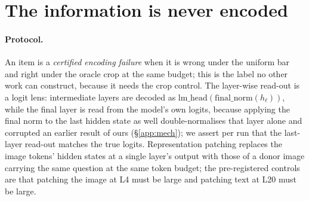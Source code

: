 
\section{The information is never encoded}\label{app:encoding}

\paragraph{Protocol.} An item is a \emph{certified encoding failure} when it is wrong under the
uniform bar and right under the oracle crop at the same budget; this is the label no other work can
construct, because it needs the crop control. The layer-wise read-out is a logit lens: intermediate
layers are decoded as $\mathrm{lm\_head}(\mathrm{final\_norm}(h_\ell))$, while the final layer is
read from the model's own logits, because applying the final norm to the last hidden state as well
double-normalises that layer alone and corrupted an earlier result of ours (\S\ref{app:mech}); we
assert per run that the last-layer read-out matches the true logits. Representation patching replaces
the image tokens' hidden states at a single layer's output with those of a donor image carrying the
same question at the same token budget; the pre-registered controls are that patching the image at
L4 must be large and patching text at L20 must be large.

